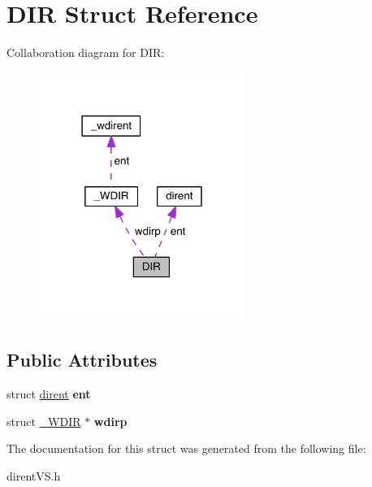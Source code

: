 \hypertarget{struct_d_i_r}{}\section{D\+IR Struct Reference}
\label{struct_d_i_r}


Collaboration diagram for D\+IR\+:
\nopagebreak
\begin{figure}[H]
\begin{center}
\leavevmode
\includegraphics[width=190pt]{struct_d_i_r__coll__graph}
\end{center}
\end{figure}
\subsection*{Public Attributes}
\begin{DoxyCompactItemize}
\item 
struct \hyperlink{structdirent}{dirent} {\bfseries ent}\hypertarget{struct_d_i_r_a59e9f5211cbb2f8e5b2807ccfdd2a7fc}{}\label{struct_d_i_r_a59e9f5211cbb2f8e5b2807ccfdd2a7fc}

\item 
struct \hyperlink{struct___w_d_i_r}{\+\_\+\+W\+D\+IR} $\ast$ {\bfseries wdirp}\hypertarget{struct_d_i_r_a29362d4a3d7f809d0f5418b26cac5d41}{}\label{struct_d_i_r_a29362d4a3d7f809d0f5418b26cac5d41}

\end{DoxyCompactItemize}


The documentation for this struct was generated from the following file\+:\begin{DoxyCompactItemize}
\item 
dirent\+V\+S.\+h\end{DoxyCompactItemize}
